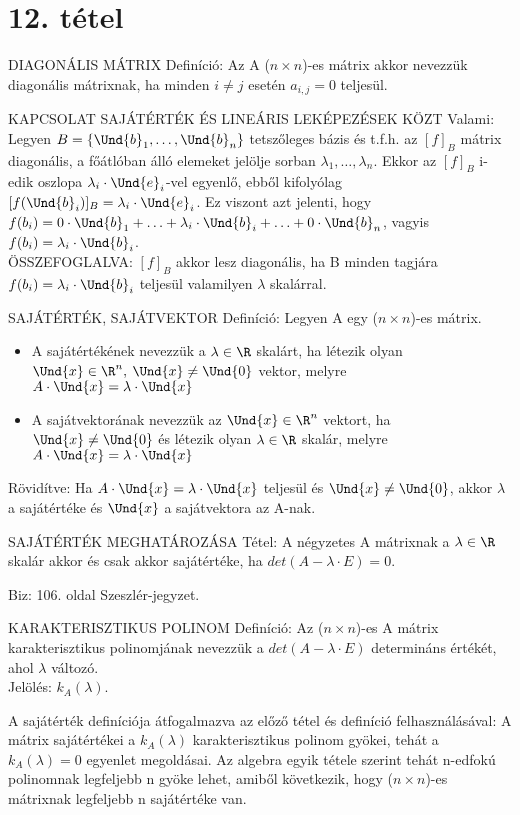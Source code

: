 \section{12. tétel}

\begin{definicio}{
DIAGONÁLIS MÁTRIX Definíció}: Az A ($n \times n$)-es mátrix akkor nevezzük diagonális mátrixnak, ha minden $i \neq j$ esetén $a_{i,j} = 0$ teljesül.
\end{definicio}
\begin{tetel}{
KAPCSOLAT SAJÁTÉRTÉK ÉS LINEÁRIS LEKÉPEZÉSEK KÖZT Valami}:
Legyen $B = \{\Und{b}_1, \ldots, \Und{b}_n\}$ tetszőleges bázis és t.f.h. az $[f]_B$ mátrix diagonális, a főátlóban álló elemeket jelölje sorban $\lambda_1, \ldots, \lambda_n$. Ekkor az $[f]_B$ i-edik oszlopa $\lambda_i\cdot\Und{e}_i$-vel egyenlő, ebből kifolyólag $[f(\Und{b}_i)]_B = \lambda_i \cdot \Und{e}_i$. Ez viszont azt jelenti, hogy $f(b_i) = 0\cdot\Und{b}_1 + \ldots + \lambda_i \cdot \Und{b}_i + \ldots + 0 \cdot\Und{b}_n$, vagyis $f(b_i) = \lambda_i \cdot \Und{b}_i$.\\
ÖSSZEFOGLALVA: $[f]_B$ akkor lesz diagonális, ha B minden tagjára $f(b_i) = \lambda_i \cdot \Und{b}_i$ teljesül valamilyen $\lambda$ skalárral.
\end{tetel}
\begin{definicio}{
SAJÁTÉRTÉK, SAJÁTVEKTOR Definíció}: Legyen A egy ($n \times n$)-es mátrix.
\begin{itemize}
\item A sajátértékének nevezzük a $\lambda \in \R$ skalárt, ha létezik olyan $\Und{x} \in \R^n,\: \Und{x} \neq \Und{0}$ vektor, melyre $A \cdot \Und{x} = \lambda\cdot \Und{x}$
\item A sajátvektorának nevezzük az $\Und{x} \in \R^n$ vektort, ha $\Und{x} \neq \Und{0}$ és létezik olyan $\lambda \in \R$ skalár, melyre $A \cdot \Und{x} = \lambda\cdot \Und{x}$
\end{itemize}
Rövidítve: Ha $A\cdot\Und{x} = \lambda\cdot\Und{x}$ teljesül és $\Und{x} \neq \Und{0}$, akkor $\lambda$ a sajátértéke és $\Und{x}$ a sajátvektora az A-nak.
\end{definicio}
\begin{tetel}{
SAJÁTÉRTÉK MEGHATÁROZÁSA Tétel}: A négyzetes A mátrixnak a $\lambda \in \R$ skalár akkor és csak akkor sajátértéke, ha $det(A - \lambda\cdot E) = 0$.
\end{tetel}
\begin{leftbar}
Biz: 106. oldal Szeszlér-jegyzet.
\end{leftbar}
\begin{definicio}{
KARAKTERISZTIKUS POLINOM Definíció}: Az ($n \times n$)-es A mátrix karakterisztikus polinomjának nevezzük a $det(A - \lambda\cdot E)$ determináns értékét, ahol $\lambda$ változó.\\
Jelölés: $k_A(\lambda)$.
\end{definicio}
A sajátérték definíciója átfogalmazva az előző tétel és definíció felhasználásával: A mátrix sajátértékei a $k_A(\lambda)$ karakterisztikus polinom gyökei, tehát a $k_A(\lambda) = 0$ egyenlet megoldásai. Az algebra egyik tétele szerint tehát n-edfokú polinomnak legfeljebb n gyöke lehet, amiből következik, hogy ($n \times n$)-es mátrixnak legfeljebb n sajátértéke van.
